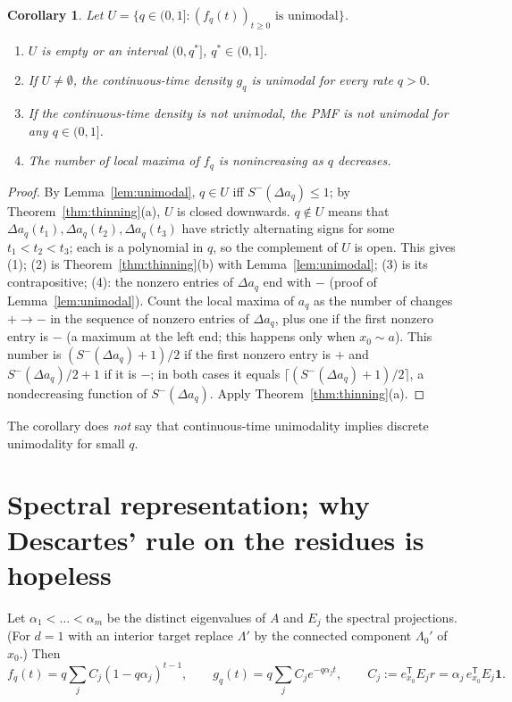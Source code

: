 \documentclass[11pt,a4paper]{article}
\newtheorem{corollary}[theorem]{Corollary}
\theoremstyle{definition}
\newcommand{\one}{\mathbf 1}
\newcommand{\Sm}{S^{-}}
\newcommand{\T}{^{\mathsf T}}
\begin{document}
\begin{corollary}\label{cor:interval}
Let $U=\{q\in(0,1]:(f_q(t))_{t\ge0}\text{ is unimodal}\}$.
\begin{enumerate}
\item $U$ is empty or an interval $(0,q^*]$, $q^*\in(0,1]$.
\item If $U\neq\emptyset$, the continuous-time density $g_q$ is unimodal for every rate $q>0$.
\item If the continuous-time density is not unimodal, the PMF is not unimodal for any $q\in(0,1]$.
\item The number of local maxima of $f_q$ is nonincreasing as $q$ decreases.
\end{enumerate}
\end{corollary}
\begin{proof}
By Lemma~\ref{lem:unimodal}, $q\in U$ iff $\Sm(\Delta a_q)\le1$; by Theorem~\ref{thm:thinning}(a), $U$ is closed downwards. $q\notin U$ means that $\Delta a_q(t_1),\Delta a_q(t_2),\Delta a_q(t_3)$ have strictly alternating signs for some $t_1<t_2<t_3$; each is a polynomial in $q$, so the complement of $U$ is open. This gives (1); (2) is Theorem~\ref{thm:thinning}(b) with Lemma~\ref{lem:unimodal}; (3) is its contrapositive; (4): the nonzero entries of $\Delta a_q$ end with $-$ (proof of Lemma~\ref{lem:unimodal}). Count the local maxima of $a_q$ as the number of changes $+\to-$ in the sequence of nonzero entries of $\Delta a_q$, plus one if the first nonzero entry is $-$ (a maximum at the left end; this happens only when $x_0\sim a$). This number is $(\Sm(\Delta a_q)+1)/2$ if the first nonzero entry is $+$ and $\Sm(\Delta a_q)/2+1$ if it is $-$; in both cases it equals $\lceil(\Sm(\Delta a_q)+1)/2\rceil$, a nondecreasing function of $\Sm(\Delta a_q)$. Apply Theorem~\ref{thm:thinning}(a).
\end{proof}

The corollary does \emph{not} say that continuous-time unimodality implies discrete unimodality for small $q$.

\section{Spectral representation; why Descartes' rule on the residues is hopeless}\label{sec:residues}

Let $\alpha_1<\dots<\alpha_m$ be the distinct eigenvalues of $A$ and $E_j$ the spectral projections. (For $d=1$ with an interior target replace $\Lambda'$ by the connected component $\Lambda_0'$ of $x_0$.) Then
\begin{equation}\label{eq:spectral}
f_q(t)=q\sum_jC_j(1-q\alpha_j)^{t-1},\qquad g_q(t)=q\sum_jC_je^{-q\alpha_jt},\qquad C_j:=e_{x_0}\T E_jr=\alpha_j\,e_{x_0}\T E_j\one .
\end{equation}
\end{document}
